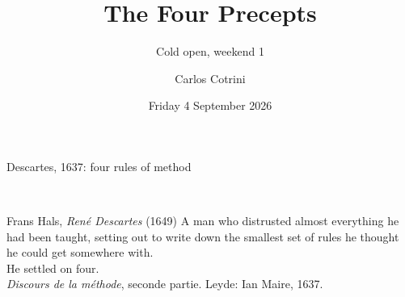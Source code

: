 \documentclass[aspectratio=169]{beamer}
\title{The Four Precepts}
\subtitle{Cold open, weekend 1}
\author{Carlos Cotrini}
\date{Friday 4 September 2026}
\begin{document}
%
%
\begin{frame}{Descartes, 1637: four rules of method}
  \vspace{1mm}
  \begin{columns}[c]
    \centering
      \\[3pt]
      {\scriptsize\color{muted}Frans Hals, \textit{Ren\'e Descartes} (1649)}
      {\footnotesize A man who distrusted almost everything he had been taught,
      setting out to write down the smallest set of rules he thought he could
      get somewhere with.}\\[10pt]
      {\footnotesize He settled on four.}\\[14pt]
      {\scriptsize\color{muted}\textit{Discours de la m\'ethode}, seconde partie.
      Leyde: Ian Maire, 1637.}
  \end{columns}
\end{frame}
\end{document}
